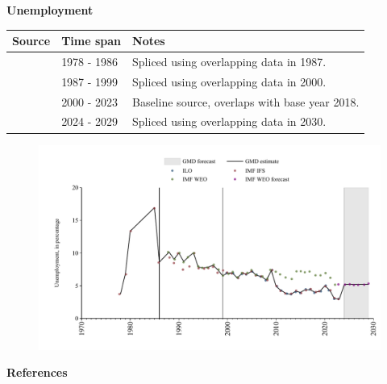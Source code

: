 \documentclass[12pt,a4paper,landscape]{article}
\begin{document}
\begin{adjustbox}{max totalsize={\paperwidth}{\paperheight},center}
\begin{minipage}[t][\textheight][t]{\textwidth}
\vspace*{0.5cm}
{}
\begin{center}
{\Large\bfseries Unemployment}
\end{center}
\vspace{0.5cm}
\begin{table}[H]
\centering
\small
\begin{tabular}{|l|l|l|}
\hline
\textbf{Source} & \textbf{Time span} & \textbf{Notes} \\
\hline
\rowcolor{white}\cite{IMF_IFS}& 1978 - 1986 &Spliced using overlapping data in 1987. \\
\rowcolor{lightgray}\cite{IMF_WEO}& 1987 - 1999 &Spliced using overlapping data in 2000. \\
\rowcolor{white}\cite{ILO}& 2000 - 2023 &Baseline source, overlaps with base year 2018. \\
\rowcolor{lightgray}\cite{IMF_WEO_forecast}& 2024 - 2029 &Spliced using overlapping data in 2030. \\
\hline
\end{tabular}
\end{table}
\begin{figure}[H]
\centering
\includegraphics[width=\textwidth,height=0.6\textheight,keepaspectratio]{graphs/SLV_unemp.pdf}
\end{figure}
\end{minipage}
\end{adjustbox}
{}
\begin{center}
{\Large\bfseries References}
\end{center}
\small


\end{document}
